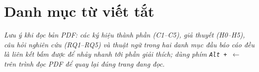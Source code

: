 \documentclass[a4paper,table]{article}
\theoremstyle{definition}
\newcommand{\tblfont}{\fontsize{10.5pt}{14.5pt}\selectfont}
\begin{document}



\newpage
\tableofcontents

\cleardoublepage
{}
{}
\section*{Danh mục từ viết tắt}

\noindent\textit{\tblfont Lưu ý khi đọc bản PDF: các ký hiệu thành phần (C1--C5), giả thuyết (H0--H5), câu hỏi nghiên cứu (RQ1--RQ5) và thuật ngữ trong hai danh mục đầu báo cáo đều là liên kết bấm được để nhảy nhanh tới phần giải thích; dùng phím \texttt{Alt + $\leftarrow$} trên trình đọc PDF để quay lại đúng trang đang đọc.}
\end{document}
